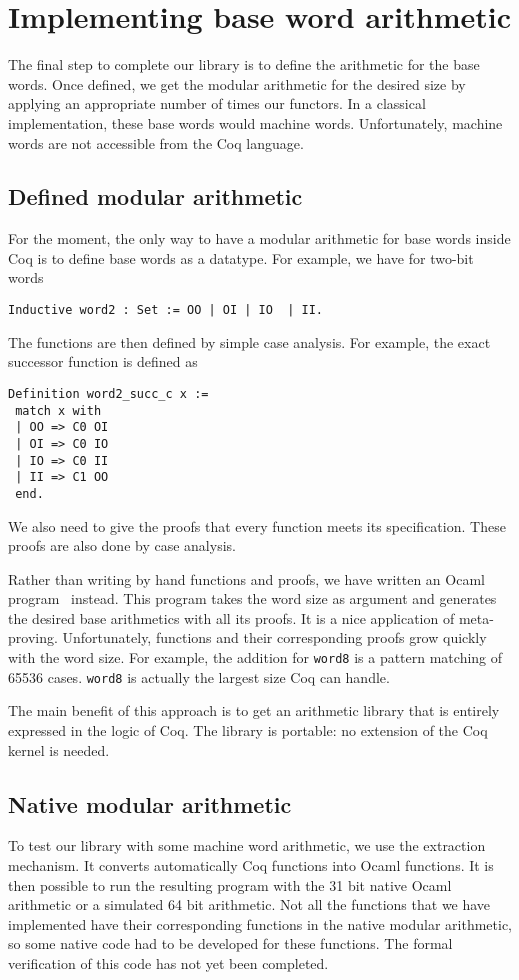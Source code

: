 \section{Implementing base word arithmetic \label{word}}

The final step to complete our library is to define the arithmetic for the base words. 
Once defined,  we get the modular arithmetic for the desired size by applying an appropriate
number of times our functors. In a classical implementation, these base words would machine words.
Unfortunately, machine words are not accessible from the {\sc Coq} language. 

\subsection{Defined modular arithmetic}

For the moment, the only way to have a modular arithmetic for base words inside {\sc Coq}
is to define base words as a datatype. For example, we have for two-bit words
\begin{verbatim}
Inductive word2 : Set := OO | OI | IO  | II.
\end{verbatim}
The functions are then defined by simple case analysis. For example,
the exact successor function is defined as
\begin{verbatim}
Definition word2_succ_c x :=
 match x with
 | OO => C0 OI
 | OI => C0 IO
 | IO => C0 II
 | II => C1 OO
 end.
\end{verbatim}
We also need to give the proofs that every function meets its specification.
These proofs are also done by case analysis. 

Rather than writing by hand functions and proofs, we have
written an {\sc Ocaml} program~\cite{ocaml} instead. This program takes the word
size as argument and generates the desired base arithmetics with all
its proofs. It is a nice application of meta-proving. Unfortunately, 
functions and their corresponding proofs grow quickly with the word size. 
For example, the addition for {\tt word8} is a pattern matching of 65536 cases. 
{\tt word8} is actually the largest size {\sc Coq} can handle. 

The main benefit of  this approach is to get an arithmetic library that is entirely expressed 
in the logic of {\sc Coq}. The library is portable: no extension of the {\sc Coq} kernel 
is needed. 

\subsection{Native modular arithmetic}

To test our library with some machine word arithmetic, we use the extraction
mechanism. It converts automatically {\sc Coq} functions into {\sc Ocaml} functions.
It is then possible to run the resulting program with the 31 bit native
{\sc Ocaml} arithmetic or a simulated 64 bit arithmetic. 
Not all the functions that we have implemented have their corresponding functions in the 
native modular arithmetic, so some native code had to be developed for these functions.
The formal verification of this code has not yet been completed.
